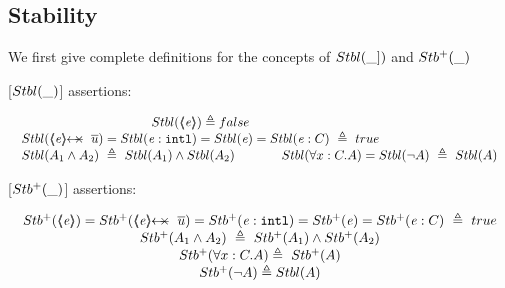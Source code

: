 \subsection{Stability}


We first give complete definitions for the concepts of $  {Stbl( \_] )}$ and ${Stb^+( \_ )}$

\vspace{.2cm}

\begin{definition}
\label{def:Basic}
[${Stbl( \_ )}$] assertions: %

$
\begin{array}{l}
 \begin{array}{c}
  \Stable {\inside{\re}}  \triangleq  false \\
    \Stable {\protectedFrom \re {\overline {u}}} =  
  \Stable  {\internal \re} =  %
    \Stable {\re}=   
     \Stable {\re:C}\   \triangleq \    true
 \end{array}
  \\
 \begin{array}{lcl}
 \Stable  {A_1  \wedge  A_2}\  \triangleq\     \Stable  { A_1}  \wedge    \Stable  {A_2}    &
\lclSPACE  &  
 \Stable  {\forall x:C.A} =\Stable  {\neg A} \   \triangleq\   \Stable A
 \end{array}
 \end{array}
$
\label{f:Basic}
 \end{definition}


 \begin{definition}
[${Stb^+( \_ )}$] assertions: %

$
\begin{array}{l}
 \begin{array}{c}
  \Pos {\inside{\re}} =  \Pos {\protectedFrom \re {\overline {u}}} =  
  \Pos  {\internal \re} =   
    \Pos {\re}=   
     \Pos {\re:C}\   \triangleq \    true
     \\
 \Pos  {A_1  \wedge  A_2}\  \triangleq\     \Pos  { A_1}  \wedge    \Pos  {A_2}  
  \\ 
 \Pos  {\forall x:C.A}   \triangleq\   \Pos A
\\ %
  \Pos {\neg A}  \triangleq \Stable A %
\end{array}
 \end{array}
 $
 \label{def:Pos}
\end{definition}

